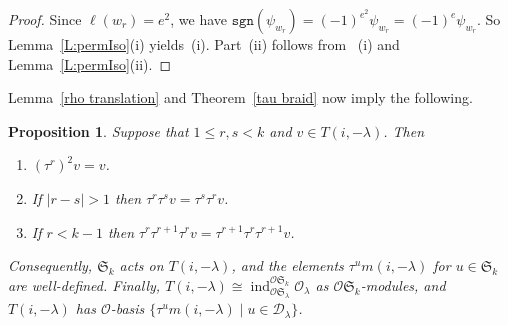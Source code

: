 \documentclass[twoside,11pt,reqno]{amsart}
\numberwithin{equation}{section}
\newtheorem{Proposition}[equation]{Proposition}
\newtheorem{Corollary}[equation]{Corollary}
\theoremstyle{definition}  %
\newcommand{\ind}{\operatorname{ind}}
\def\sgn{\mathtt{sgn}}
\newcommand{\0}{{\bar 0}}
\newcommand{\1}{{\bar 1}}
\newcommand{\la}{\lambda}
\def\Si{\mathfrak{S}}
\newcommand{\si}{\sigma}
\def\triv#1{\O_{#1}}
\newcommand{\D}{{\mathscr D}}
\renewcommand\O{\mathcal O}
\begin{document}
\begin{proof}
Since $\ell(w_r)=e^2$, we have $\sgn(\psi_{w_r})=(-1)^{e^2}\psi_{w_r}=(-1)^{e}\psi_{w_r}$. So Lemma~\ref{L:permIso}(i) yields~(i). Part~(ii) follows 
  from ~(i) and Lemma~\ref{L:permIso}(ii).
\end{proof}

%
%
%



Lemma~\ref{rho translation} and 
Theorem~\ref{tau braid} now imply the following.

\begin{Proposition}\label{signed tau braid}
  Suppose that $1\le r,s<k$ and $v\in T(i,-\la)$. Then
  \begin{enumerate}
  \item $(\tau^r)^2v=v$.
     \item If $|r-s|>1$ then 
        $\tau^r\tau^sv=\tau^s\tau^rv$.
     \item If $r< k-1$ then
        $\tau^r\tau^{r+1}\tau^rv= 
                \tau^{r+1}\tau^r\tau^{r+1}v$.
  \end{enumerate}
  Consequently, $\Si_k$ acts on $T(i,-\la)$, and the elements $\tau^um(i,-\la)$ for $u\in \Si_k$ are well-defined. Finally,  $T(i,-\la)\cong\ind_{\O\Si_\la}^{\O\Si_k}\triv{\la}$ as $\O\Si_k$-modules, and $T(i,-\la)$ has $\O$-basis $\{\tau^um(i,-\la)\mid u\in\D_\la\}
$.  

\end{Proposition}
\end{document}
